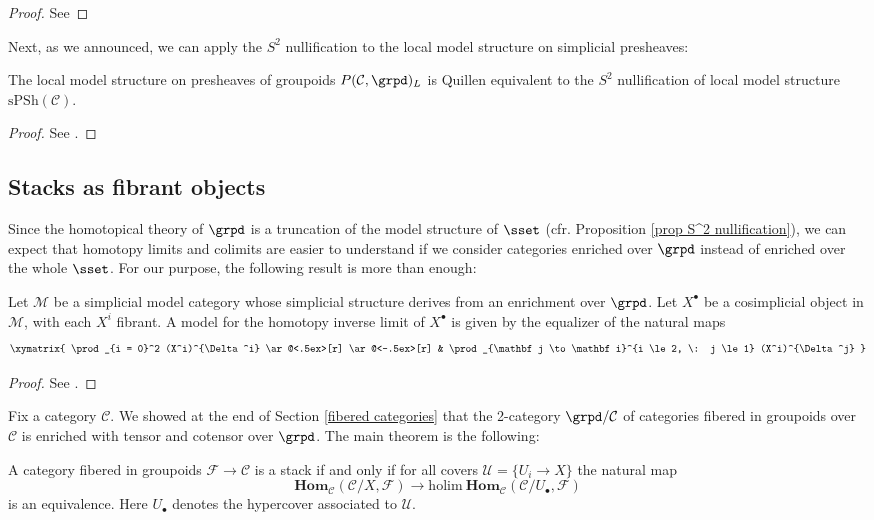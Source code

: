 \begin{proof}
See 
\end{proof}

Next, as we announced, we can apply the $S^2$ nullification to the local model structure on simplicial presheaves:

\begin{thm}
The local model structure on presheaves of groupoids $P(\mathcal C, \grpd)_L$ is Quillen equivalent to the $S^2$ nullification of local model structure $\mathrm{sPSh}(\mathcal C)$.
\end{thm}

\begin{proof}
See .
\end{proof}

\subsection{Stacks as fibrant objects}

Since the homotopical theory of $\grpd$ is a truncation of the model structure of $\sset$ (cfr. Proposition \ref{prop S^2 nullification}), we can expect that homotopy limits and colimits are easier to understand if we consider categories enriched over $\grpd$ instead of enriched over the whole $\sset$. For our purpose, the following result is more than enough:

\begin{thm}
Let $\mathcal M$ be a simplicial model category whose simplicial structure derives from an enrichment over $\grpd$. Let $X^\bullet$ be a cosimplicial object in $\mathcal M$, with each $X^i$ fibrant. A model for the homotopy inverse limit of $X^\bullet$ is given by the equalizer of the natural maps
\[
\xymatrix{
\prod_{i = 0}^2 (X^i)^{\Delta^i} \ar@<.5ex>[r] \ar@<-.5ex>[r] & \prod_{\mathbf j \to \mathbf i}^{i \le 2, \: j \le 1} (X^i)^{\Delta^j}
}
\]
\end{thm}

\begin{proof}
See .
\end{proof}


Fix a category $\mathcal C$. We showed at the end of Section \ref{fibered categories} that the 2-category $\grpd / \mathcal C$ of categories fibered in groupoids over $\mathcal C$ is enriched with tensor and cotensor over $\grpd$. The main theorem is the following:

\begin{thm} \label{thm homotopical descent condition 1}
A category fibered in groupoids $\mathcal F \to \mathcal C$ is a stack if and only if for all covers $\mathcal U = \{U_i \to X\}$ the natural map
\[
\mathbf{Hom}_{\mathcal C}(\mathcal C / X, \mathcal F) \to \mathrm{holim} \: \mathbf{Hom}_{\mathcal C}(\mathcal C / U_\bullet, \mathcal F)
\]
is an equivalence. Here $U_\bullet$ denotes the hypercover associated to $\mathcal U$.
\end{thm}


